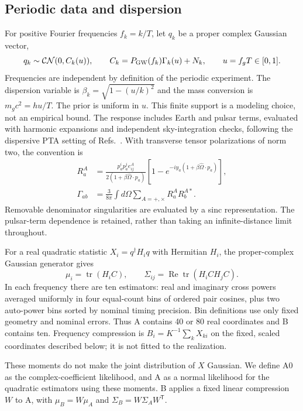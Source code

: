 \documentclass[11pt,a4paper]{article}
\begin{document}
\subsection{Periodic data and dispersion}
For positive Fourier frequencies $f_k=k/T$, let $q_k$ be a proper complex Gaussian vector,
\begin{equation}
 q_k\sim\mathcal{CN}(0,C_k(u)),\qquad
 C_k=P_{\rm GW}(f_k)\Gamma_k(u)+N_k,\qquad
 u=f_gT\in[0,1].
\end{equation}
Frequencies are independent by definition of the periodic experiment. The dispersion variable is $\beta_k=\sqrt{1-(u/k)^2}$ and the mass conversion is $m_gc^2=hu/T$. The prior is uniform in $u$. This finite support is a modeling choice, not an empirical bound. The response includes Earth and pulsar terms, evaluated with harmonic expansions and independent sky-integration checks, following the dispersive PTA setting of Refs.~\cite{liang2021,cordes2025}. With transverse tensor polarizations of norm two, the convention is
\begin{align}
 R_a^A&=\frac{p_a^ip_a^je^A_{ij}}{2(1+\beta\widehat\Omega\cdot p_a)}
 [1-e^{-iy_a(1+\beta\widehat\Omega\cdot p_a)}],\\
 \Gamma_{ab}&=\frac{3}{8\pi}\int d\Omega\sum_{A=+,\times}R_a^A R_b^{A*}.
\end{align}
Removable denominator singularities are evaluated by a sinc representation. The pulsar-term dependence is retained, rather than taking an infinite-distance limit throughout.

For a real quadratic statistic $X_i=q^\dagger H_iq$ with Hermitian $H_i$, the proper-complex Gaussian generator gives
\begin{equation}
 \mu_i=\operatorname{tr}(H_iC),\qquad
 \Sigma_{ij}=\operatorname{Re}\operatorname{tr}(H_iCH_jC).
\end{equation}
In each frequency there are ten estimators: real and imaginary cross powers averaged uniformly in four equal-count bins of ordered pair cosines, plus two auto-power bins sorted by nominal timing precision. Bin definitions use only fixed geometry and nominal errors. Thus A contains 40 or 80 real coordinates and B contains ten. Frequency compression is $B_i=K^{-1}\sum_k X_{ki}$ on the fixed, scaled coordinates described below; it is not fitted to the realization.

These moments do not make the joint distribution of $X$ Gaussian. We define A0 as the complex-coefficient likelihood, and A as a normal likelihood for the quadratic estimators using these moments. B applies a fixed linear compression $W$ to A, with $\mu_B=W\mu_A$ and $\Sigma_B=W\Sigma_AW^{\mathsf T}$.
\end{document}
